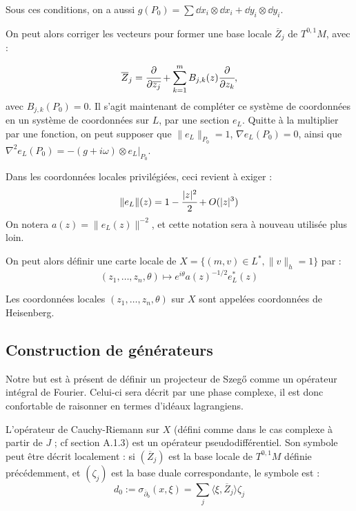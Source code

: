 \begin{rem}
	Sous ces conditions, on a aussi $g(P_0) = \sum \dd x_i \otimes \dd x_i + \dd y_i \otimes \dd y_i$.
\end{rem}

On peut alors corriger les vecteurs pour former une base locale $\overline{Z}_j$ de $T^{0,1}M$, avec :

\begin{equation*}
	\overline{Z}_j = \cfrac{\partial}{\partial \overline{z_j}} + \sum_{k=1}^mB_{j,k}(z)\cfrac{\partial}{\partial z_k},
\end{equation*}
avec $B_{j,k}(P_0)=0$.
Il s'agit maintenant de compléter ce système de coordonnées en un système de coordonnées sur $L$, par une section $e_L$. Quitte à la multiplier par une fonction, on peut supposer que  $\|e_L\|_{P_0}=1$, $\nabla e_L(P_0)=0$, ainsi que $\nabla^2e_L(P_0)=-(g+i\omega)\otimes e_L|_{P_0}$.

Dans les coordonnées locales privilégiées, ceci revient à exiger :
\begin{equation*}
\|e_L\|(z)=1-\cfrac{|z|^2}{2} + O(|z|^3)
\end{equation*}
On notera $a(z)=\|e_L(z)\|^{-2}$, et cette notation sera à nouveau utilisée plus loin.

On peut alors définir une carte locale de $X = \{(m,v)\in L^*, \|v\|_h=1 \}$ par :
\begin{equation*}
(z_1, \ldots, z_n, \theta) \mapsto e^{i\theta}a(z)^{-1/2}e_L^*(z)
\end{equation*}

Les coordonnées locales $(z_1, \ldots, z_n, \theta)$ sur $X$ sont appelées coordonnées de Heisenberg.
 
\subsection{Construction de générateurs}

Notre but est à présent de définir un projecteur de Szeg\H{o} comme un opérateur intégral de Fourier. Celui-ci sera décrit par une phase complexe, il est donc confortable de raisonner en termes d'idéaux lagrangiens. 

L'opérateur de Cauchy-Riemann sur $X$ (défini comme dans le cas
complexe à partir de $J$ ; cf section A.1.3) est un opérateur pseudodifférentiel. Son symbole peut être décrit localement : si $(\overline{Z}_j)$ est la base locale de $T^{0,1}M$ définie précédemment, et $(\zeta_j)$ est la base duale correspondante, le symbole est :
\begin{equation*}
	d_0 := \sigma_{\overline{\partial}_b}(x,\xi) = \sum_{j} \langle \xi, \overline{Z}_j \rangle \zeta_j
\end{equation*}

